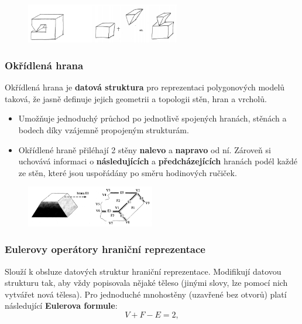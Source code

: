 \begin{figure}[H]
	\centering
	\includegraphics[width=0.6\textwidth]{assets/4_hranicnic_manifold}
\end{figure} 

\subsubsection{Okřídlená hrana}
Okřídlená hrana je \textbf{datová struktura} pro reprezentaci polygonových modelů taková, že jasně definuje jejich geometrii a topologii stěn, hran a vrcholů.

\begin{itemize}
\item Umožňuje jednoduchý průchod po jednotlivě spojených hranách, stěnách a bodech díky vzájemně propojeným strukturám.
\item Okřídlené hraně přiléhají 2 stěny \textbf{nalevo} a \textbf{napravo} od ní. Zároveň si uchovává informaci o \textbf{následujících} a \textbf{předcházejících} hranách podél každé ze stěn, které jsou uspořádány po směru hodinových ručiček.
\end{itemize}

\begin{figure}[H]
\centering
\includegraphics[width=0.5\textwidth]{assets/4_okridlena_hrana}
\end{figure} 

\subsubsection{Eulerovy operátory hraniční reprezentace}
Slouží k obsluze datových struktur hraniční reprezentace. Modifikují datovou strukturu tak, aby vždy popisovala nějaké těleso (jinými slovy, lze pomocí nich vytvářet nová tělesa). Pro jednoduché mnohostěny (uzavřené bez otvorů) platí následující \textbf{Eulerova formule}:
\begin{equation*}
V + F - E = 2,
\end{equation*}

